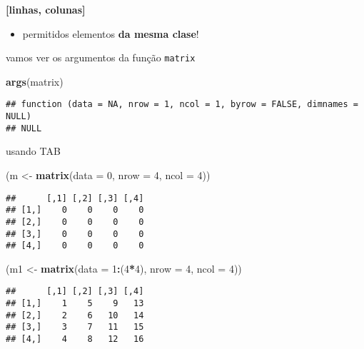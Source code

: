 \documentclass[]{book}
\newenvironment{Shaded}{\begin{snugshade}}{\end{snugshade}}
\newcommand{\KeywordTok}[1]{\textcolor[rgb]{0.13,0.29,0.53}{\textbf{#1}}}
\newcommand{\DataTypeTok}[1]{\textcolor[rgb]{0.13,0.29,0.53}{#1}}
\newcommand{\DecValTok}[1]{\textcolor[rgb]{0.00,0.00,0.81}{#1}}
\newcommand{\StringTok}[1]{\textcolor[rgb]{0.31,0.60,0.02}{#1}}
\newcommand{\OperatorTok}[1]{\textcolor[rgb]{0.81,0.36,0.00}{\textbf{#1}}}
\newcommand{\NormalTok}[1]{#1}
\providecommand{\tightlist}{%
  \setlength{\itemsep}{0pt}\setlength{\parskip}{0pt}}
\theoremstyle{definition}
\theoremstyle{definition}
\theoremstyle{definition}
\theoremstyle{remark}
\begin{document}
\textbf{{[}linhas, colunas{]}}

\begin{itemize}
\tightlist
\item
  permitidos elementos \textbf{da mesma clase}!
\end{itemize}

vamos ver os argumentos da função \texttt{matrix}

\begin{Shaded}
\begin{Highlighting}[]
\KeywordTok{args}\NormalTok{(matrix)}
\end{Highlighting}
\end{Shaded}

\begin{verbatim}
## function (data = NA, nrow = 1, ncol = 1, byrow = FALSE, dimnames = NULL) 
## NULL
\end{verbatim}

usando TAB

\begin{Shaded}
\begin{Highlighting}[]
\NormalTok{(m <-}\StringTok{ }\KeywordTok{matrix}\NormalTok{(}\DataTypeTok{data =} \DecValTok{0}\NormalTok{, }\DataTypeTok{nrow =} \DecValTok{4}\NormalTok{, }\DataTypeTok{ncol =} \DecValTok{4}\NormalTok{))}
\end{Highlighting}
\end{Shaded}

\begin{verbatim}
##      [,1] [,2] [,3] [,4]
## [1,]    0    0    0    0
## [2,]    0    0    0    0
## [3,]    0    0    0    0
## [4,]    0    0    0    0
\end{verbatim}

\begin{Shaded}
\begin{Highlighting}[]
\NormalTok{(m1 <-}\StringTok{ }\KeywordTok{matrix}\NormalTok{(}\DataTypeTok{data =} \DecValTok{1}\OperatorTok{:}\NormalTok{(}\DecValTok{4}\OperatorTok{*}\DecValTok{4}\NormalTok{), }\DataTypeTok{nrow =} \DecValTok{4}\NormalTok{, }\DataTypeTok{ncol =} \DecValTok{4}\NormalTok{))}
\end{Highlighting}
\end{Shaded}

\begin{verbatim}
##      [,1] [,2] [,3] [,4]
## [1,]    1    5    9   13
## [2,]    2    6   10   14
## [3,]    3    7   11   15
## [4,]    4    8   12   16
\end{verbatim}
\end{document}
